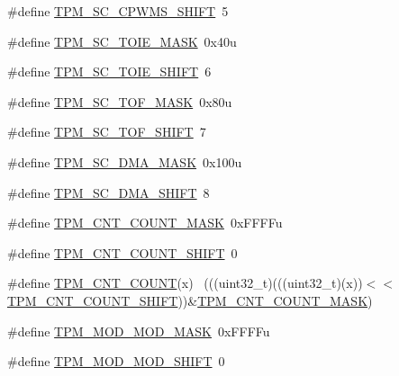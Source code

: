 \begin{DoxyCompactItemize}
\item 
\#define \hyperlink{group___t_p_m___register___masks_ga1bf84a093f66cf0f37c7b77ee16c32b3}{T\+P\+M\+\_\+\+S\+C\+\_\+\+C\+P\+W\+M\+S\+\_\+\+S\+H\+I\+FT}~5
\item 
\#define \hyperlink{group___t_p_m___register___masks_ga67bad1290533531584e40005c865380d}{T\+P\+M\+\_\+\+S\+C\+\_\+\+T\+O\+I\+E\+\_\+\+M\+A\+SK}~0x40u
\item 
\#define \hyperlink{group___t_p_m___register___masks_ga6ab65f7b4d48095133fd762e1595eb3a}{T\+P\+M\+\_\+\+S\+C\+\_\+\+T\+O\+I\+E\+\_\+\+S\+H\+I\+FT}~6
\item 
\#define \hyperlink{group___t_p_m___register___masks_gae25305cad922790ffe882f8d4d423439}{T\+P\+M\+\_\+\+S\+C\+\_\+\+T\+O\+F\+\_\+\+M\+A\+SK}~0x80u
\item 
\#define \hyperlink{group___t_p_m___register___masks_gaa58c9acc6863e92d142671b2da4b60a5}{T\+P\+M\+\_\+\+S\+C\+\_\+\+T\+O\+F\+\_\+\+S\+H\+I\+FT}~7
\item 
\#define \hyperlink{group___t_p_m___register___masks_ga5d17b5a81f3f84eee65c94d5b0e7eca6}{T\+P\+M\+\_\+\+S\+C\+\_\+\+D\+M\+A\+\_\+\+M\+A\+SK}~0x100u
\item 
\#define \hyperlink{group___t_p_m___register___masks_ga04279ab580223012d6e172ce92a5f8c5}{T\+P\+M\+\_\+\+S\+C\+\_\+\+D\+M\+A\+\_\+\+S\+H\+I\+FT}~8
\item 
\#define \hyperlink{group___t_p_m___register___masks_gae4ca4e3ce211106290e584675dab1d28}{T\+P\+M\+\_\+\+C\+N\+T\+\_\+\+C\+O\+U\+N\+T\+\_\+\+M\+A\+SK}~0x\+F\+F\+F\+Fu
\item 
\#define \hyperlink{group___t_p_m___register___masks_gabc68cb7f4dfd853021c35f9cad5b05e2}{T\+P\+M\+\_\+\+C\+N\+T\+\_\+\+C\+O\+U\+N\+T\+\_\+\+S\+H\+I\+FT}~0
\item 
\#define \hyperlink{group___t_p_m___register___masks_ga6abbd5e59974bb79b28bda463b493a85}{T\+P\+M\+\_\+\+C\+N\+T\+\_\+\+C\+O\+U\+NT}(x)                                              ~(((uint32\+\_\+t)(((uint32\+\_\+t)(x))$<$$<$\hyperlink{group___t_p_m___register___masks_gabc68cb7f4dfd853021c35f9cad5b05e2}{T\+P\+M\+\_\+\+C\+N\+T\+\_\+\+C\+O\+U\+N\+T\+\_\+\+S\+H\+I\+FT}))\&\hyperlink{group___t_p_m___register___masks_gae4ca4e3ce211106290e584675dab1d28}{T\+P\+M\+\_\+\+C\+N\+T\+\_\+\+C\+O\+U\+N\+T\+\_\+\+M\+A\+SK})
\item 
\#define \hyperlink{group___t_p_m___register___masks_ga547f0f1f80a59cf7a5c19b6e5ee66055}{T\+P\+M\+\_\+\+M\+O\+D\+\_\+\+M\+O\+D\+\_\+\+M\+A\+SK}~0x\+F\+F\+F\+Fu
\item 
\#define \hyperlink{group___t_p_m___register___masks_gad3b8c1cb94d29448d0eef30e94d65299}{T\+P\+M\+\_\+\+M\+O\+D\+\_\+\+M\+O\+D\+\_\+\+S\+H\+I\+FT}~0
$$
\end{DoxyCompactItemize}
